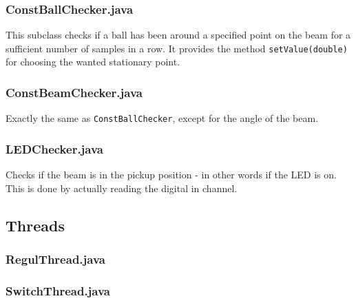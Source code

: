 
\subsubsection{ConstBallChecker.java}

This subclass checks if a ball has been around a specified point on the beam for a sufficient number of samples in a row. It provides the method \texttt{setValue(double)} for choosing the wanted stationary point.

\subsubsection{ConstBeamChecker.java}

Exactly the same as \texttt{ConstBallChecker}, except for the angle of the beam.

\subsubsection{LEDChecker.java}

Checks if the beam is in the pickup position - in other words if the LED is on. This is done by actually reading the digital in channel.

\subsection{Threads}

\subsubsection{RegulThread.java}

\subsubsection{SwitchThread.java}
